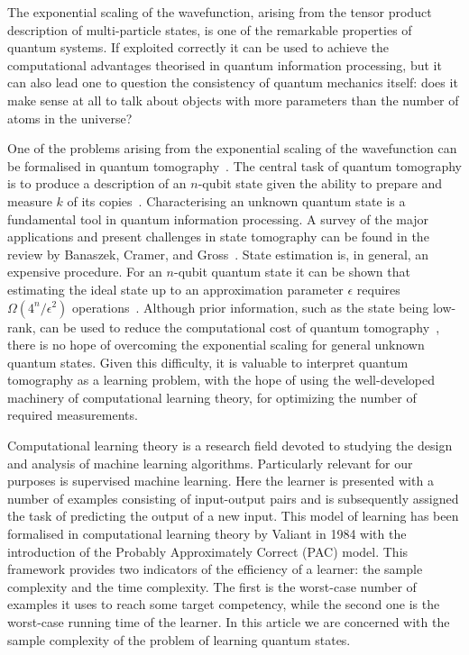 \documentclass[aps,superscriptaddress,nofootinbib,twocolumn]{revtex4-1}
\begin{document}
The exponential scaling of the wavefunction, arising from the tensor product description of multi-particle states, is one of the remarkable properties of quantum systems. If exploited correctly it can be used to achieve the computational advantages theorised in quantum information processing, but it can also lead one to question the consistency of quantum mechanics itself: does it make sense at all to talk about objects with more parameters than the number of atoms in the universe?

One of the problems arising from the exponential scaling of the wavefunction can be formalised in quantum tomography~\cite{banaszek2013focus, haah2017sample, gross2010quantum, quantumTomo, TomoHighDim, lvovsky2009continuous, cramer2010efficient, o2016efficient}. The central task of quantum tomography is to produce a description of an $n$-qubit state given the ability to prepare and measure $k$ of its copies~\cite{lvovsky2009continuous}. Characterising an unknown quantum state is a fundamental tool in quantum information processing. A survey of the major applications and present challenges in state tomography can be found in the review by Banaszek, Cramer, and Gross~\cite{banaszek2013focus}. State estimation is, in general, an expensive procedure. For an $n$-qubit quantum state it can be shown that estimating the ideal state up to an approximation parameter $\epsilon$ requires $\Omega(4^n / \epsilon^2)$ operations~\cite{haah2017sample}. Although prior information, such as the state being low-rank, can be used to reduce the computational cost of quantum tomography~\cite{gross2010quantum, cramer2010efficient, o2016efficient}, there is no hope of overcoming the exponential scaling for general unknown quantum states. Given this difficulty, it is valuable to interpret quantum tomography as a learning problem, with the hope of using the well-developed machinery of computational learning theory, for optimizing the number of required measurements.

Computational learning theory \cite{kearns1994introduction, shalev2014understanding} is a research field devoted to studying the design and analysis of machine learning algorithms. Particularly relevant for our purposes is supervised machine learning. Here the learner is presented with a number of examples consisting of input-output pairs and is subsequently assigned the task of predicting the output of a new input. This model of learning has been formalised in computational learning theory by Valiant in 1984 \cite{valiant1984theory} with the introduction of the Probably Approximately Correct (PAC) model. This framework provides two indicators of the efficiency of a learner: the sample complexity and the time complexity. The first is the worst-case number of examples it uses to reach some target competency, while the second one is the worst-case running time of the learner. In this article we are concerned with the sample complexity of the problem of learning quantum states.
\end{document}
